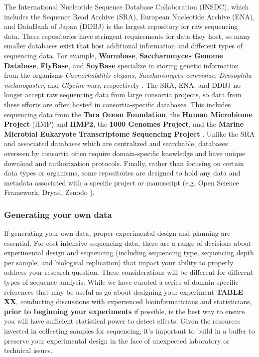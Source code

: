 \documentclass[10pt,letterpaper]{article}
\begin{document}
The International Nucleotide Sequence Database Collaboration (INSDC), which includes the Sequence Read Archive (SRA), European Nucleotide Archive (ENA), and DataBank of Japan (DDBJ) is the largest repository for raw sequencing data. 
These repositories have stringent requirements for data they host, so many smaller databases exist that host additional information and different types of sequencing data.
For example, \textbf{Wormbase}, \textbf{Saccharomyces Genome Database}, \textbf{FlyBase}, and \textbf{SoyBase} specialize in storing genetic information from the organisms \textit{Caenorhabditis elegans}, \textit{Saccharomyces cerevisiae}, \textit{Drosophila melanogaster}, and \textit{Glycine max}, respectively \cite{harris2020wormbase, cherry2012saccharomyces, st2014flybase, grant2010soybase}. 
The SRA, ENA, and DDBJ no longer accept raw sequencing data from large consortia projects, so data from these efforts are often hosted in consortia-specific databases. 
This includes sequencing data from the \textbf{Tara Ocean Foundation}, the \textbf{Human Microbiome Project} (HMP) and \textbf{HMP2}, the \textbf{1000 Genomes Project}, and the \textbf{Marine Microbial Eukaryote Transcriptome Sequencing Project} \cite{pesant2015open, turnbaugh2007human, integrative2014integrative, clarke20121000, keeling2014marine}. 
Unlike the SRA and associated databases which are centralized and searchable, databases overseen by consortia often require domain-specific knowledge and have unique download and authorization protocols. 
Finally, rather than focusing on certain data types or organisms, some repositories are designed to hold any data and metadata associated with a specific project or manuscript (e.g. Open Science Framework, Dryad, Zenodo \cite{foster2017open}).


\subsubsection*{Generating your own data}
If generating your own data, proper experimental design and planning are essential. 
For cost-intensive sequencing data, there are a range of decisions about experimental design and sequencing (including sequencing type, sequencing depth per sample, and biological replication) that impact your ability to properly address your research question. 
These considerations will be different for different types of sequence analysis. 
While we have curated a series of domain-specific references that may be useful as go about designing your experiment \textbf{TABLE XX}, conducting discussions with experienced bioinformaticians and statisticians, \textbf{prior to beginning your experiments} if possible, is the best way to ensure you will have sufficient statistical power to detect effects.
Given the resources invested in collecting samples for sequencing, it's important to build in a buffer to preserve your experimental design in the face of unexpected laboratory or technical issues. 
\end{document}
